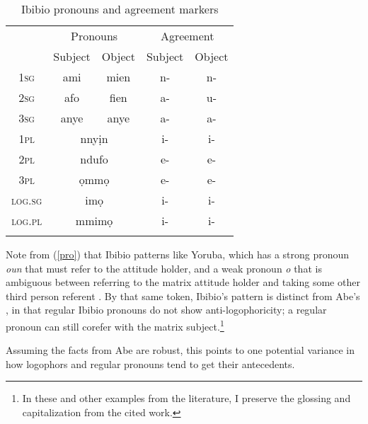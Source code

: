 \documentclass[output=paper]{langscibook}
\begin{document}
\begin{table}
\centering
\begin{tabular}{>{\scshape}ccccc}
\lsptoprule
	& \multicolumn{2}{c}{Pronouns}	&	\multicolumn{2}{c}{Agreement}	\\\cmidrule(lr){2-3}\cmidrule(lr){4-5}
	&	Subject		&	Object		&	Subject 	&	Object			\\ \midrule
1sg	&	ami	&	mien	&	n- & n-	\\
2sg	&	afo	&	fien	& a-	& u- 		\\
3sg	&	anye	&	anye	& a-	&	a-	\\ 
1pl	&	\multicolumn{2}{c}{nny\d{i}n}	&	i-	&	i-	\\
2pl	&	\multicolumn{2}{c}{ndufo}	& e-	& e-	\\
3pl	&	\multicolumn{2}{c}{\d{o}mm\d{o}} & e-		& e- \\
\textsc{log.sg}	& \multicolumn{2}{c}{im\d{o}}	&	i-	& i-	\\
\textsc{log.pl}	&	\multicolumn{2}{c}{mmim\d{o}}	& i-	& i-	\\
\lspbottomrule
\end{tabular}
\caption{Ibibio pronouns and agreement markers}
\end{table}



Note from (\ref{pro}) that Ibibio patterns like Yoruba, which has a strong pronoun \textit{oun} that must refer to the attitude holder, and a weak pronoun \textit{o} that is ambiguous between referring to the matrix attitude holder and taking some other third person referent \citep[(\ref{yor})][]{Adesola2005}. By that same token, Ibibio's pattern is distinct from Abe's \citep[(\ref{abe})]{Koopman1989}, in that regular Ibibio pronouns do not show anti-logophoricity; a regular pronoun can still corefer with the matrix subject.\footnote{In these and other examples from the literature, I preserve the glossing and capitalization from the cited work.}
\begin{exe}
	
\end{exe}
Assuming the facts from Abe are robust, this points to one potential variance in how logophors and regular pronouns tend to get their antecedents.
\end{document}
